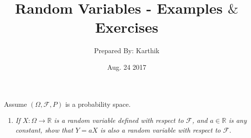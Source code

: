 \documentclass[11pt]{article}
\title {\sc Random Variables - Examples $\&$ Exercises}
\date{Aug. 24 2017}
\author{Prepared By: Karthik}
\begin{document}
\maketitle 
\pagestyle{fancy}

Assume $(\Omega,\mathcal{F},P)$ is a probability space.
\begin{enumerate}
%
	
\item \emph{If $X:\Omega\to \mathbb{R}$ is a random variable defined with respect to $\mathcal{F}$, and $a\in \mathbb{R}$ is any constant, show that $Y=aX$ is also a random variable with respect to $\mathcal{F}$}.\\
	

\end{enumerate}
\end{document}
